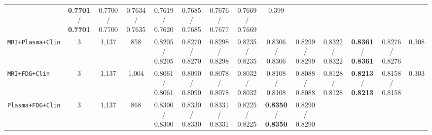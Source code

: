 \documentclass[10pt,twocolumn]{article}
\begin{document}
\begin{table}[t]
{\begin{tabular}{@{}>{\raggedright\arraybackslash}p{2.65cm}ccccccccccccc@{}}
{/\\0.7547} & \shortstack{\textbf{0.7701} /\\\textbf{0.7701}} & \shortstack{0.7700 /\\0.7700} &
\shortstack{0.7634 /\\0.7635} & \shortstack{0.7619 /\\0.7620} & \shortstack{0.7685 /\\0.7685} &
\shortstack{0.7676 /\\0.7677} & \shortstack{0.7669 /\\0.7669} & 0.399 \\
\texttt{MRI+Plasma+Clin} & 3 & 1,137 & 858 & \shortstack{0.8205 /\\0.8205} & \shortstack{0.8270
/\\0.8270} & \shortstack{0.8298 /\\0.8298} & \shortstack{0.8235 /\\0.8235} &
\shortstack{0.8306 /\\0.8306} & \shortstack{0.8299 /\\0.8299} & \shortstack{0.8322 /\\0.8322} &
\shortstack{\textbf{0.8361} /\\\textbf{0.8361}} & \shortstack{0.8276 /\\0.8276} & 0.308 \\
\texttt{MRI+FDG+Clin} & 3 & 1,137 & 1,004 & \shortstack{0.8061 /\\0.8061} & \shortstack{0.8090
/\\0.8090} & \shortstack{0.8078 /\\0.8078} & \shortstack{0.8032 /\\0.8032} & \shortstack{0.8108
/\\0.8108} & \shortstack{0.8088 /\\0.8088} & \shortstack{0.8128 /\\0.8128} &
\shortstack{\textbf{0.8213} /\\\textbf{0.8213}} & \shortstack{0.8158 /\\0.8158} & 0.303 \\
\texttt{Plasma+FDG+Clin} & 3 & 1,137 & 868 & \shortstack{0.8300 /\\0.8300} & \shortstack{0.8330
/\\0.8330} & \shortstack{0.8331 /\\0.8331} & \shortstack{0.8225 /\\0.8225} &
\shortstack{\textbf{0.8350} /\\\textbf{0.8350}} & \shortstack{0.8290 /\\0.8290} &

\end{tabular}}
\end{table}
\end{document}
